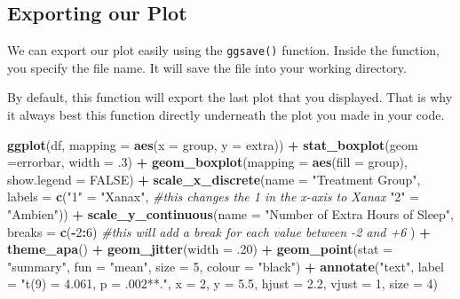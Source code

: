 \documentclass[
]{book}
\newenvironment{Shaded}{\begin{snugshade}}{\end{snugshade}}
\newcommand{\AttributeTok}[1]{\textcolor[rgb]{0.13,0.29,0.53}{#1}}
\newcommand{\CommentTok}[1]{\textcolor[rgb]{0.56,0.35,0.01}{\textit{#1}}}
\newcommand{\ConstantTok}[1]{\textcolor[rgb]{0.56,0.35,0.01}{#1}}
\newcommand{\DecValTok}[1]{\textcolor[rgb]{0.00,0.00,0.81}{#1}}
\newcommand{\FloatTok}[1]{\textcolor[rgb]{0.00,0.00,0.81}{#1}}
\newcommand{\FunctionTok}[1]{\textcolor[rgb]{0.13,0.29,0.53}{\textbf{#1}}}
\newcommand{\NormalTok}[1]{#1}
\newcommand{\OtherTok}[1]{\textcolor[rgb]{0.56,0.35,0.01}{#1}}
\newcommand{\SpecialCharTok}[1]{\textcolor[rgb]{0.81,0.36,0.00}{\textbf{#1}}}
\newcommand{\StringTok}[1]{\textcolor[rgb]{0.31,0.60,0.02}{#1}}
\begin{document}
\subsection{Exporting our Plot}\label{exporting-our-plot}

We can export our plot easily using the \texttt{ggsave()} function. Inside the function, you specify the file name. It will save the file into your working directory.

By default, this function will export the last plot that you displayed. That is why it always best this function directly underneath the plot you made in your code.

\begin{Shaded}
\begin{Highlighting}[]
\FunctionTok{ggplot}\NormalTok{(df, }\AttributeTok{mapping =} \FunctionTok{aes}\NormalTok{(}\AttributeTok{x =}\NormalTok{ group, }\AttributeTok{y =}\NormalTok{ extra)) }\SpecialCharTok{+} 
  \FunctionTok{stat\_boxplot}\NormalTok{(}\AttributeTok{geom =}\StringTok{\textquotesingle{}errorbar\textquotesingle{}}\NormalTok{, }\AttributeTok{width =}\NormalTok{ .}\DecValTok{3}\NormalTok{) }\SpecialCharTok{+}
  \FunctionTok{geom\_boxplot}\NormalTok{(}\AttributeTok{mapping =} \FunctionTok{aes}\NormalTok{(}\AttributeTok{fill =}\NormalTok{ group), }\AttributeTok{show.legend =} \ConstantTok{FALSE}\NormalTok{) }\SpecialCharTok{+} 
  \FunctionTok{scale\_x\_discrete}\NormalTok{(}\AttributeTok{name =} \StringTok{"Treatment Group"}\NormalTok{,}
                   \AttributeTok{labels =} \FunctionTok{c}\NormalTok{(}\StringTok{"1"}  \OtherTok{=} \StringTok{"Xanax"}\NormalTok{, }\CommentTok{\#this changes the 1 in the x{-}axis to Xanax}
                              \StringTok{"2"} \OtherTok{=} \StringTok{"Ambien"}\NormalTok{)) }\SpecialCharTok{+}
  \FunctionTok{scale\_y\_continuous}\NormalTok{(}\AttributeTok{name =} \StringTok{"Number of Extra Hours of Sleep"}\NormalTok{, }
                     \AttributeTok{breaks =} \FunctionTok{c}\NormalTok{(}\SpecialCharTok{{-}}\DecValTok{2}\SpecialCharTok{:}\DecValTok{6}\NormalTok{) }\CommentTok{\#this will add a break for each value between {-}2 and +6}
\NormalTok{                     ) }\SpecialCharTok{+}
  \FunctionTok{theme\_apa}\NormalTok{() }\SpecialCharTok{+}
  \FunctionTok{geom\_jitter}\NormalTok{(}\AttributeTok{width =}\NormalTok{ .}\DecValTok{20}\NormalTok{) }\SpecialCharTok{+}
  \FunctionTok{geom\_point}\NormalTok{(}\AttributeTok{stat =} \StringTok{"summary"}\NormalTok{, }\AttributeTok{fun =} \StringTok{"mean"}\NormalTok{, }\AttributeTok{size =} \DecValTok{5}\NormalTok{, }\AttributeTok{colour =} \StringTok{"black"}\NormalTok{) }\SpecialCharTok{+} 
  \FunctionTok{annotate}\NormalTok{(}\StringTok{"text"}\NormalTok{,}
           \AttributeTok{label =} \StringTok{"t(9) = 4.061, p = .002**."}\NormalTok{,}
           \AttributeTok{x =} \DecValTok{2}\NormalTok{,}
           \AttributeTok{y =} \FloatTok{5.5}\NormalTok{, }
           \AttributeTok{hjust =} \FloatTok{2.2}\NormalTok{, }
           \AttributeTok{vjust =} \DecValTok{1}\NormalTok{, }
           \AttributeTok{size =} \DecValTok{4}\NormalTok{)}



\end{Highlighting}
\end{Shaded}
\end{document}

